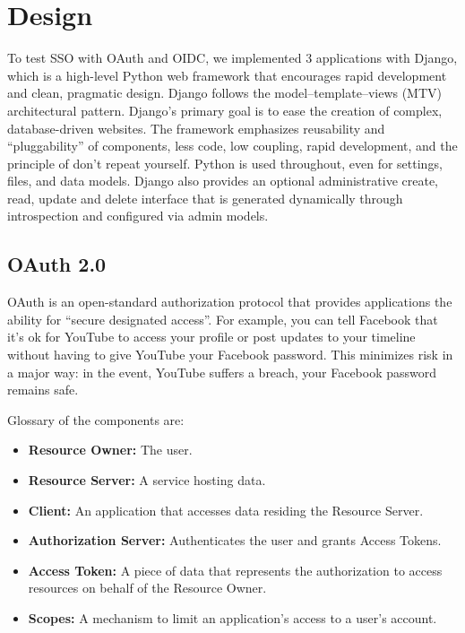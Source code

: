 \section{Design}

To test SSO with OAuth and OIDC, we implemented 3 applications with Django, which is a high-level Python web framework that encourages rapid development and clean, pragmatic design. Django follows the model–template–views (MTV) architectural pattern. Django's primary goal is to ease the creation of complex, database-driven websites. The framework emphasizes reusability and ``pluggability'' of components, less code, low coupling, rapid development, and the principle of don't repeat yourself. Python is used throughout, even for settings, files, and data models. Django also provides an optional administrative create, read, update and delete interface that is generated dynamically through introspection and configured via admin models.



\subsection{OAuth 2.0}

OAuth is an open-standard authorization protocol that provides applications the ability for ``secure designated access''. For example, you can tell Facebook that it’s ok for YouTube to access your profile or post updates to your timeline without having to give YouTube your Facebook password. This minimizes risk in a major way: in the event, YouTube suffers a breach, your Facebook password remains safe.

Glossary of the components are:
\begin{itemize}
	
	\item \textbf{Resource Owner:} The user.
	
	\item \textbf{Resource Server:} A service hosting data.
	
	\item \textbf{Client:} An application that accesses data residing the Resource Server.
	
	\item \textbf{Authorization Server:} Authenticates the user and grants Access Tokens.
	
	\item \textbf{Access Token:} A piece of data that represents the authorization to access resources on behalf of the Resource Owner.
	
	\item \textbf{Scopes:} A mechanism to limit an application's access to a user's account.
	
\end{itemize}


